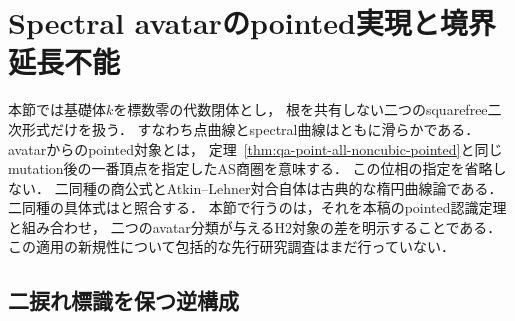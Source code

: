 \section{Spectral avatarのpointed実現と境界延長不能}
\label{sec:qa-spectral-pointed-atkin-lehner}

本節では基礎体$k$を標数零の代数閉体とし，
根を共有しない二つのsquarefree二次形式だけを扱う．
すなわち点曲線とspectral曲線はともに滑らかである．
avatarからのpointed対象とは，
定理~\ref{thm:qa-point-all-noncubic-pointed}と同じ
mutation後の一番頂点を指定したAS商圏を意味する．
この位相の指定を省略しない．
二同種の商公式とAtkin--Lehner対合自体は古典的な楕円曲線論である．
二同種の具体式は\cite[III, Example~4.5]{SilvermanAEC2009}と照合する．
本節で行うのは，それを本稿のpointed認識定理と組み合わせ，
二つのavatar分類が与えるH2対象の差を明示することである．
この適用の新規性について包括的な先行研究調査はまだ行っていない．

\subsection{二捩れ標識を保つ逆構成}


